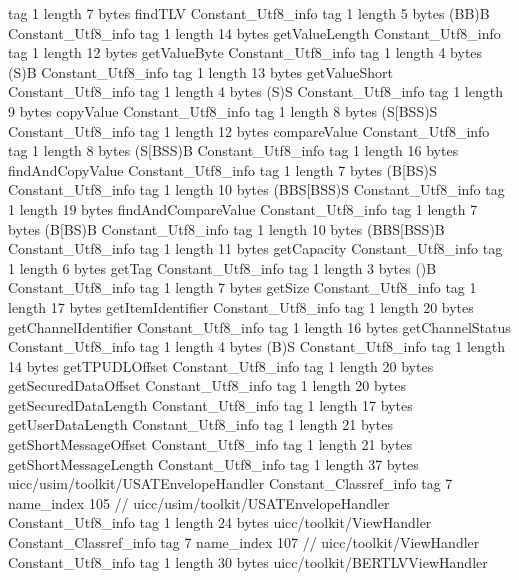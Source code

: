 {{{			tag	1
			length	7
			bytes	findTLV
		}
		Constant_Utf8_info {
			tag	1
			length	5
			bytes	(BB)B
		}
		Constant_Utf8_info {
			tag	1
			length	14
			bytes	getValueLength
		}
		Constant_Utf8_info {
			tag	1
			length	12
			bytes	getValueByte
		}
		Constant_Utf8_info {
			tag	1
			length	4
			bytes	(S)B
		}
		Constant_Utf8_info {
			tag	1
			length	13
			bytes	getValueShort
		}
		Constant_Utf8_info {
			tag	1
			length	4
			bytes	(S)S
		}
		Constant_Utf8_info {
			tag	1
			length	9
			bytes	copyValue
		}
		Constant_Utf8_info {
			tag	1
			length	8
			bytes	(S[BSS)S
		}
		Constant_Utf8_info {
			tag	1
			length	12
			bytes	compareValue
		}
		Constant_Utf8_info {
			tag	1
			length	8
			bytes	(S[BSS)B
		}
		Constant_Utf8_info {
			tag	1
			length	16
			bytes	findAndCopyValue
		}
		Constant_Utf8_info {
			tag	1
			length	7
			bytes	(B[BS)S
		}
		Constant_Utf8_info {
			tag	1
			length	10
			bytes	(BBS[BSS)S
		}
		Constant_Utf8_info {
			tag	1
			length	19
			bytes	findAndCompareValue
		}
		Constant_Utf8_info {
			tag	1
			length	7
			bytes	(B[BS)B
		}
		Constant_Utf8_info {
			tag	1
			length	10
			bytes	(BBS[BSS)B
		}
		Constant_Utf8_info {
			tag	1
			length	11
			bytes	getCapacity
		}
		Constant_Utf8_info {
			tag	1
			length	6
			bytes	getTag
		}
		Constant_Utf8_info {
			tag	1
			length	3
			bytes	()B
		}
		Constant_Utf8_info {
			tag	1
			length	7
			bytes	getSize
		}
		Constant_Utf8_info {
			tag	1
			length	17
			bytes	getItemIdentifier
		}
		Constant_Utf8_info {
			tag	1
			length	20
			bytes	getChannelIdentifier
		}
		Constant_Utf8_info {
			tag	1
			length	16
			bytes	getChannelStatus
		}
		Constant_Utf8_info {
			tag	1
			length	4
			bytes	(B)S
		}
		Constant_Utf8_info {
			tag	1
			length	14
			bytes	getTPUDLOffset
		}
		Constant_Utf8_info {
			tag	1
			length	20
			bytes	getSecuredDataOffset
		}
		Constant_Utf8_info {
			tag	1
			length	20
			bytes	getSecuredDataLength
		}
		Constant_Utf8_info {
			tag	1
			length	17
			bytes	getUserDataLength
		}
		Constant_Utf8_info {
			tag	1
			length	21
			bytes	getShortMessageOffset
		}
		Constant_Utf8_info {
			tag	1
			length	21
			bytes	getShortMessageLength
		}
		Constant_Utf8_info {
			tag	1
			length	37
			bytes	uicc/usim/toolkit/USATEnvelopeHandler
		}
		Constant_Classref_info {
			tag	7
			name_index	105		// uicc/usim/toolkit/USATEnvelopeHandler
		}
		Constant_Utf8_info {
			tag	1
			length	24
			bytes	uicc/toolkit/ViewHandler
		}
		Constant_Classref_info {
			tag	7
			name_index	107		// uicc/toolkit/ViewHandler
		}
		Constant_Utf8_info {
			tag	1
			length	30
			bytes	uicc/toolkit/BERTLVViewHandler
}}}
